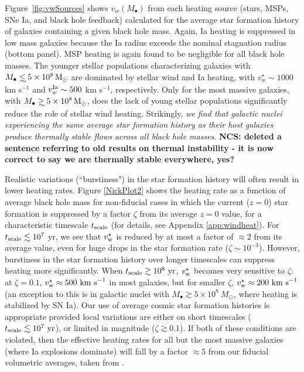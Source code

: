 \documentclass[usenatbib,fleqn]{mn2e}
\newcommand\lsim{\mathrel{\rlap{\lower4pt\hbox{\hskip1pt$\sim$}}
    \raise1pt\hbox{$<$}}}
\newcommand\gsim{\mathrel{\rlap{\lower4pt\hbox{\hskip1pt$\sim$}}
    \raise1pt\hbox{$>$}}}
\newcommand{\Mbh}[1][]{M_{\bullet#1}}
\newcommand{\vwO}{v_{w}}
\begin{document}
Figure~\ref{fig:vwSources} shows $\vwO(M_{\bullet})$ from each heating source (stars, MSPs, SNe Ia, and black hole feedback) calculated for the average star formation history of galaxies containing a given black hole mass.  Again, Ia heating is suppressed in low mass galaxies because the Ia radius exceeds the nominal stagnation radius (bottom panel).  MSP heating is again found to be negligible for all black hole masses.  The younger stellar populations characterizing galaxies with $\Mbh\lsim 5\times 10^{8} \Msun$ are dominated by stellar wind and Ia heating, with $v_{w}^{\star} \sim 1000$ km s$^{-1}$ and $v_w^{\rm Ia} \sim 500$ km s$^{-1}$, respectively.  Only for the most massive galaxies, with $\Mbh\gsim 5\times 10^{8} \Msun$, does the lack of young stellar populations significantly reduce the role of stellar wind heating.   %
Strikingly, {\it we find that galactic nuclei experiencing the same average star formation history as their host galaxies produce thermally stable flows across all black hole masses}.  {\bf NCS: deleted a sentence referring to old results on thermal instability - it is now correct to say we are thermally stable everywhere, yes?}

Realistic variations (``burstiness") in the star formation history will often result in lower heating rates.  Figure \ref{NickPlot2} shows the heating rate as a function of average black hole mass for non-fiducial cases in which the current ($z = 0$) star formation is suppressed by a factor $\zeta$ from its average $z = 0$ value, for a characteristic timescale $t_{\rm scale}$ (for details, see Appendix \ref{app:windheat}).  For $t_{\rm scale} \lesssim 10^{7}$ yr, we see that $v_{\rm w}^{\star}$ is reduced by at most a factor of $\approx 2$ from its average value, even for huge drops in the star formation rate ($\zeta \sim 10^{-3}$).  However, burstiness in the star formation history over longer timescales can suppress heating more significantly.  When $t_{\rm scale} \gtrsim 10^8~{\rm yr}$, $v_{\rm w}^\star$ becomes very sensitive to $\zeta$: at $\zeta=0.1$, $v_{\rm w}^\star \approx 500~{\rm km~s}^{-1}$ in most galaxies, but for smaller $\zeta$, $v_{\rm w}^\star \approx 200~{\rm km~s}^{-1}$ (an exception to this is in galactic nuclei with $M_\bullet \gtrsim 5\times 10^8~M_\odot$, where heating is stabilized by SN Ia).  Our use of average cosmic star formation histories is appropriate provided local variations are either on short timescales ($t_{\rm scale} \lesssim 10^7~{\rm yr}$), or limited in magnitude ($\zeta \gtrsim 0.1$).  If both of these conditions are violated, then the effective heating rates for all but the most massive galaxies (where Ia explosions dominate) will fall by a factor $\approx 5$ from our fiducial volumetric averages, taken from \citet{MosterNaab+:2013a}.
\end{document}
